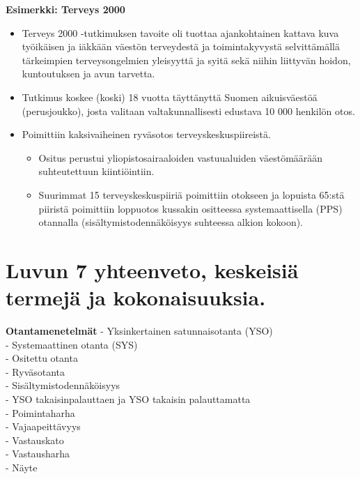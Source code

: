 \documentclass[
]{book}
\providecommand{\tightlist}{%
  \setlength{\itemsep}{0pt}\setlength{\parskip}{0pt}}
\begin{document}
\hfill\break

\begin{eblock}{}

\textbf{Esimerkki: Terveys 2000}

\begin{itemize}
\tightlist
\item
  Terveys 2000 -tutkimuksen tavoite oli tuottaa ajankohtainen kattava kuva työikäisen ja iäkkään väestön terveydestä ja toimintakyvystä selvittämällä tärkeimpien terveysongelmien yleisyyttä ja syitä sekä niihin liittyvän hoidon, kuntoutuksen ja avun tarvetta.
\item
  Tutkimus koskee (koski) 18 vuotta täyttänyttä Suomen aikuisväestöä (perusjoukko), josta valitaan valtakunnallisesti edustava 10 000 henkilön otos.
\item
  Poimittiin kaksivaiheinen ryväsotos terveyskeskuspiireistä.

  \begin{itemize}
  \tightlist
  \item
    Ositus perustui yliopistosairaaloiden vastuualuiden väestömäärään suhteutettuun kiintiöintiin.
  \item
    Suurimmat 15 terveyskeskuspiiriä poimittiin otokseen ja lopuista 65:stä piiristä poimittiin loppuotos kussakin ositteessa systemaattisella (PPS) otannalla (sisältymistodennäköisyys suhteessa alkion kokoon).
  \end{itemize}
\end{itemize}

\end{eblock}

\hypertarget{luvun-7-yhteenveto-keskeisiuxe4-termejuxe4-ja-kokonaisuuksia.}{%
\section{Luvun 7 yhteenveto, keskeisiä termejä ja kokonaisuuksia.}\label{luvun-7-yhteenveto-keskeisiuxe4-termejuxe4-ja-kokonaisuuksia.}}

\textbf{Otantamenetelmät}
- Yksinkertainen satunnaisotanta (YSO)\\
- Systemaattinen otanta (SYS)\\
- Ositettu otanta\\
- Ryväsotanta\\
- Sisältymistodennäköisyys\\
- YSO takaisinpalauttaen ja YSO takaisin palauttamatta\\
- Poimintaharha\\
- Vajaapeittävyys\\
- Vastauskato\\
- Vastausharha\\
- Näyte
\end{document}
